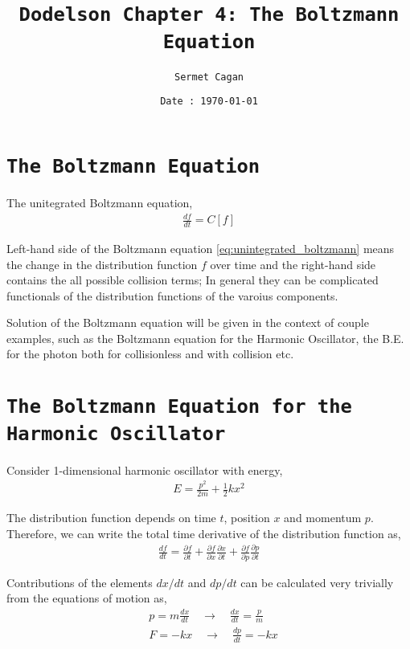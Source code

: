 
\title{\texttt{Dodelson Chapter 4: The Boltzmann Equation}}
\author{\texttt{Sermet Cagan}}
\date{\texttt{Date : \today}}


\maketitle
\newpage

\section{\texttt{The Boltzmann Equation}}
The unitegrated Boltzmann equation,
\begin{align}
\label{eq:unintegrated_boltzmann}
\frac{df}{dt} = C\left[f\right]
\end{align}

Left-hand side of the Boltzmann equation \ref{eq:unintegrated_boltzmann} means the change in the distribution function $f$ over time and the right-hand side contains the all possible collision terms; In general they can be complicated functionals of the distribution functions of the varoius components.

Solution of the Boltzmann equation will be given in the context of couple examples, such as the Boltzmann equation for the Harmonic Oscillator, the B.E. for the photon both for collisionless and with collision etc.

\section{\texttt{The Boltzmann Equation for the Harmonic Oscillator}}
Consider 1-dimensional harmonic oscillator with energy,
\begin{align}
E = \frac{p^{2}}{2m} + \frac{1}{2}kx^{2}
\end{align}

The distribution function depends on time $t$, position $x$ and momentum $p$. Therefore, we can write the total time derivative of the distribution function as,
\begin{align}
\frac{df}{dt} = \frac{\partial f}{\partial t} + \frac{\partial f}{\partial x}\frac{\partial x}{\partial t} + \frac{\partial f}{\partial p}\frac{\partial p}{\partial t}
\end{align}

Contributions of the elements $dx/dt$ and $dp/dt$ can be calculated very trivially from the equations of motion as,
\begin{align}
&p = m\frac{dx}{dt}\quad \rightarrow\quad \frac{dx}{dt} = \frac{p}{m}\\
&F = -kx\quad \rightarrow\quad \frac{dp}{dt} = -kx
\end{align}

